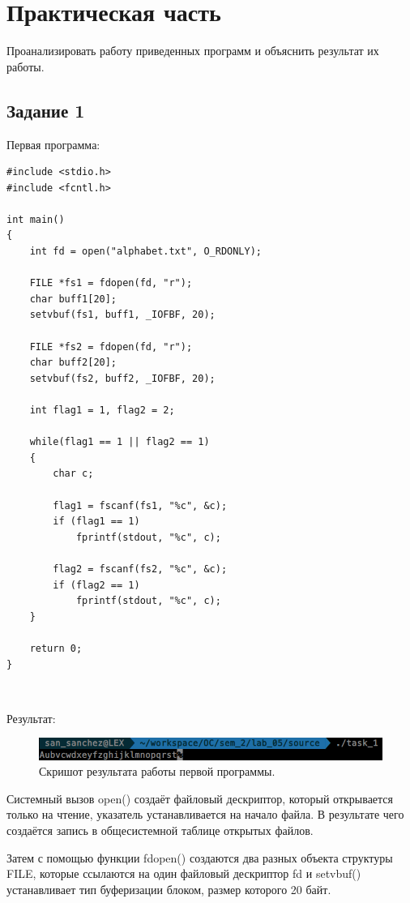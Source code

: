 \chapter{Практическая часть}

Проанализировать работу приведенных программ и объяснить результат их работы.

\section{Задание \No{}1}
Первая программа:
\lstset{language=c}
\begin{lstlisting}[caption=Текст программы первого задания]
#include <stdio.h>
#include <fcntl.h>

int main()
{
    int fd = open("alphabet.txt", O_RDONLY);

    FILE *fs1 = fdopen(fd, "r");
    char buff1[20];
    setvbuf(fs1, buff1, _IOFBF, 20);

    FILE *fs2 = fdopen(fd, "r");
    char buff2[20];
    setvbuf(fs2, buff2, _IOFBF, 20);

    int flag1 = 1, flag2 = 2;

    while(flag1 == 1 || flag2 == 1)
    {
        char c;

        flag1 = fscanf(fs1, "%c", &c);
        if (flag1 == 1)
            fprintf(stdout, "%c", c);

        flag2 = fscanf(fs2, "%c", &c);
        if (flag2 == 1)
            fprintf(stdout, "%c", c);
    }

    return 0;
}
\end{lstlisting}

~\

Результат:
\begin{figure}[H]
    \centering
    \includegraphics[scale=0.5]{data/image/task_1.png}
    \caption{Скришот результата работы первой программы.}
\end{figure}

Системный вызов open() создаёт файловый дескриптор, который открывается только на чтение, указатель устанавливается на начало файла.
В результате чего создаётся запись в общесистемной таблице открытых файлов.

Затем с помощью функции fdopen() создаются два разных объекта структуры FILE, которые ссылаются на один файловый дескриптор fd и setvbuf() устанавливает тип буферизации блоком, размер которого 20 байт.

